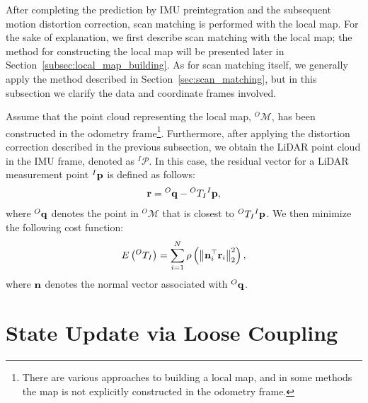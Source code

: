 After completing the prediction by IMU preintegration and the subsequent motion distortion correction, scan matching is performed with the local map.
For the sake of explanation, we first describe scan matching with the local map; the method for constructing the local map will be presented later in Section~\ref{subsec:local_map_building}.
As for scan matching itself, we generally apply the method described in Section~\ref{sec:scan_matching}, but in this subsection we clarify the data and coordinate frames involved.

Assume that the point cloud representing the local map, ${}^{O}\mathcal{M}$, has been constructed in the odometry frame\footnote{There are various approaches to building a local map, and in some methods the map is not explicitly constructed in the odometry frame.}.
Furthermore, after applying the distortion correction described in the previous subsection, we obtain the LiDAR point cloud in the IMU frame, denoted as ${}^{I}\mathcal{P}$.
In this case, the residual vector for a LiDAR measurement point ${}^{I}{\bf p}$ is defined as follows:
%
\begin{align}
  {\bf r} = {}^{O}{\bf q} - {}^{O}T_{I} {}^{I}{\bf p},
  \label{eq:residual_vector_lio_scan_matching}
\end{align}
%
where ${}^{O}{\bf q}$ denotes the point in ${}^{O}\mathcal{M}$ that is closest to ${}^{O}T_{I} {}^{I}{\bf p}$.
We then minimize the following cost function:
%
\begin{align}
  E \left( {}^{O}T_{I} \right) = \sum_{i=1}^{N} \rho \left( \left\| {\bf n}_{i}^{\top} {\bf r}_{i} \right\|_{2}^{2} \right),
  \label{eq:cost_function_lio_scan_matching}
\end{align}
%
where ${\bf n}$ denotes the normal vector associated with ${}^{O}{\bf q}$.














\section{State Update via Loose Coupling}

